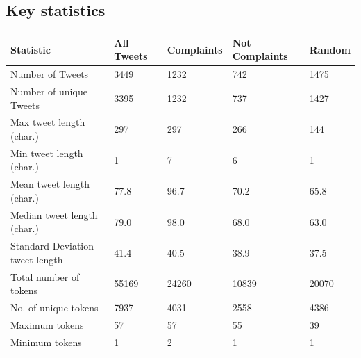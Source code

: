 \subsection{Key statistics}
\begin{table}[htbp]
    \captionsetup{font=small}
    \small
    \centering
    \begin{tabularx}{\textwidth}{|l|X|X|X|X|}
        \hline
        \rowcolor[gray]{0.7}
        \textbf{Statistic}              & \textbf{All Tweets} & \textbf{Complaints} & \textbf{Not Complaints} & \textbf{Random} \\
        \hline
        Number of Tweets                & 3449                & 1232                & 742                     & 1475            \\
        \rowcolor[gray]{0.9}
        Number of unique Tweets         & 3395                & 1232                & 737                     & 1427            \\
        \hline
        \hline
        Max tweet length (char.)        & 297                 & 297                 & 266                     & 144             \\
        \rowcolor[gray]{0.9}
        Min tweet length (char.)        & 1                   & 7                   & 6                       & 1               \\
        Mean tweet length (char.)       & 77.8                & 96.7                & 70.2                    & 65.8            \\
        \rowcolor[gray]{0.9}
        Median tweet length (char.)     & 79.0                & 98.0                & 68.0                    & 63.0            \\
        Standard Deviation tweet length & 41.4                & 40.5                & 38.9                    & 37.5            \\
        \hline
        \hline
        Total number of tokens          & 55169               & 24260               & 10839                   & 20070           \\
        \rowcolor[gray]{0.9}
        No. of unique tokens            & 7937                & 4031                & 2558                    & 4386            \\
        Maximum tokens                  & 57                  & 57                  & 55                      & 39              \\
        \rowcolor[gray]{0.9}
        Minimum tokens                  & 1                   & 2                   & 1                       & 1               \\

\end{tabularx}
\end{table}
